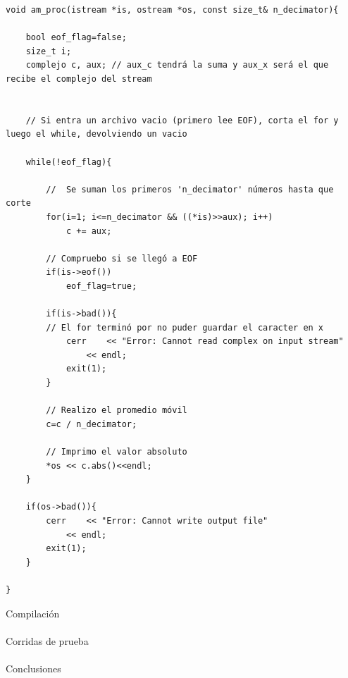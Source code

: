 \documentclass[11pt, spanish]{report}
\begin{document}
\lstset{language=C++}
\begin{lstlisting}[frame=single]
void am_proc(istream *is, ostream *os, const size_t& n_decimator){
	
	bool eof_flag=false;
	size_t i;
	complejo c, aux; // aux_c tendrá la suma y aux_x será el que recibe el complejo del stream


	// Si entra un archivo vacio (primero lee EOF), corta el for y luego el while, devolviendo un vacio

	while(!eof_flag){
		
		//  Se suman los primeros 'n_decimator' números hasta que corte
		for(i=1; i<=n_decimator && ((*is)>>aux); i++)
			c += aux;
	
		// Compruebo si se llegó a EOF
		if(is->eof())
			eof_flag=true;

		if(is->bad()){ 
		// El for terminó por no puder guardar el caracter en x
			cerr	<< "Error: Cannot read complex on input stream"
				<< endl;
			exit(1);
		}		

		// Realizo el promedio móvil
		c=c / n_decimator;
			
		// Imprimo el valor absoluto
		*os << c.abs()<<endl;
	}
	
	if(os->bad()){
		cerr	<< "Error: Cannot write output file"
			<< endl;
		exit(1);
	}

}
\end{lstlisting}

{\huge Compilación}

\paragraph{}

{\huge Corridas de prueba}

\paragraph{}

{\huge Conclusiones}

\paragraph{}
\end{document}
